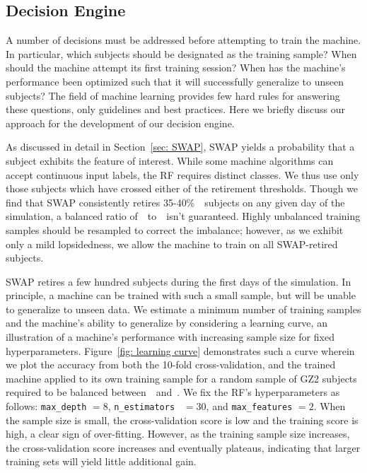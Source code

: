 \subsection{Decision Engine}\label{sec: decision engine}
A number of decisions must be addressed before attempting to train the machine. 
In particular, which subjects should be designated as the training sample? 
When should the machine attempt its first training session? 
When has the machine's performance been optimized such that it will successfully
generalize to unseen subjects? The field of machine learning provides few hard rules 
for answering these questions, only guidelines and best practices. 
Here we briefly discuss our approach for the development of our decision engine.


As discussed in detail in Section~\ref{sec: SWAP}, SWAP yields a probability that 
a subject exhibits the feature of interest. While some machine algorithms can 
accept continuous input labels, the RF requires distinct classes. We thus use only those subjects which have crossed either of the retirement thresholds. 
Though we find that SWAP consistently retires 35-40\%~\feat~subjects on 
any given day of the simulation, a balanced ratio of~\feat~to~\notfeat~isn't guaranteed. Highly unbalanced training samples should be resampled to correct the imbalance; however, as we exhibit only a mild lopsidedness, we allow the machine to train on all SWAP-retired subjects.  

SWAP retires a few hundred subjects during the first days of the simulation.
In principle, a machine can be trained with such a small sample, but will be unable to generalize to unseen data. We estimate a minimum number of training samples and the machine's ability to generalize by considering a learning curve, an illustration of a machine's performance with increasing sample size for fixed hyperparameters. 
Figure~\ref{fig: learning curve} demonstrates such a curve wherein we plot
the accuracy from both the 10-fold cross-validation, and the trained machine
applied to its own training sample for a random sample of GZ2 subjects
required to be balanced between~\feat~and~\notfeat.  
We fix the RF's hyperparameters as follows: \texttt{max\_depth} $=8$, 
\texttt{n\_estimators } $=30$, and \texttt{max\_features} $=2$. 
When the sample size is small, the cross-validation score is low and the training 
score is high, a clear sign of over-fitting.  However, as the training 
sample size increases, the cross-validation score increases and eventually plateaus,
 indicating that larger training sets will yield little additional gain. 

